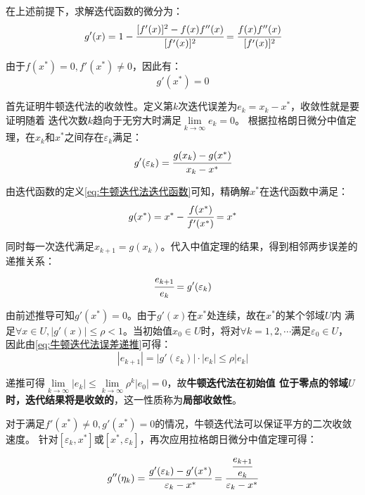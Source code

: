 在上述前提下，求解迭代函数的微分为：
\begin{equation*}
    g'(x)=1-\cfrac{[f'(x)]^2-f(x)f''(x)}{[f'(x)]^2}=\cfrac{f(x)f''(x)}{[f'(x)]^2}
\end{equation*}

由于\(f(x^*)=0,f'(x^*)\ne 0\)，因此有：
\begin{equation*}
    g'(x^*)=0
\end{equation*}

首先证明牛顿迭代法的收敛性。定义第\(k\)次迭代误差为\(e_k=x_k-x^*\)，收敛性就是要证明随着
迭代次数\(k\)趋向于无穷大时满足\(\lim\limits_{k\to\infty}e_k=0\)。
根据拉格朗日微分中值定理，在\(x_k\)和\(x^*\)之间存在\(\varepsilon_k\)满足：
\begin{equation*}
    g'(\varepsilon_k)=\cfrac{g(x_k)-g(x^*)}{x_k-x^*}
\end{equation*}

由迭代函数的定义\eqref{eq:牛顿迭代法迭代函数}可知，精确解\(x^*\)在迭代函数中满足：
\begin{equation*}
    g(x^*)=x^*-\cfrac{f(x^*)}{f'(x^*)}=x^*
\end{equation*}

同时每一次迭代满足\(x_{k+1}=g(x_k)\)。代入中值定理的结果，得到相邻两步误差的递推关系：
\begin{equation}
    \cfrac{e_{k+1}}{e_k}=g'(\varepsilon_k)
    \label{eq:牛顿迭代法误差递推}
\end{equation}

由前述推导可知\(g'(x^*)=0\)。由于\(g'(x)\)在\(x^*\)处连续，故在\(x^*\)的某个邻域\(U\)内
满足\(\forall x\in U,|g'(x)|\le\rho<1\)。当初始值\(x_0\in U\)时，将对\(\forall k=1,2,\cdots\)满足\(\varepsilon_0\in U\)，
因此由\eqref{eq:牛顿迭代法误差递推}可得：
\begin{equation*}
    |e_{k+1}|=|g'(\varepsilon_k)|\cdot|e_k|\le\rho|e_k|
\end{equation*}

递推可得\(\lim\limits_{k\to\infty}|e_k|\le\lim\limits_{k\to\infty}\rho^k|e_0|=0\)，故\textbf{牛顿迭代法在初始值
位于零点的邻域\(U\)时，迭代结果将是收敛的}，这一性质称为\textbf{局部收敛性}。

对于满足\(f'(x^*)\ne 0,g'(x^*)=0\)的情况，牛顿迭代法可以保证平方的二次收敛速度。
针对\([\varepsilon_k,x^*]\)或\([x^*,\varepsilon_k]\)，再次应用拉格朗日微分中值定理可得：
\begin{equation*}
    g''(\eta_k)=\cfrac{g'(\varepsilon_k)-g'(x^*)}{\varepsilon_k-x^*}=\cfrac{\cfrac{e_{k+1}}{e_k}}{\varepsilon_k-x^*}
\end{equation*}

